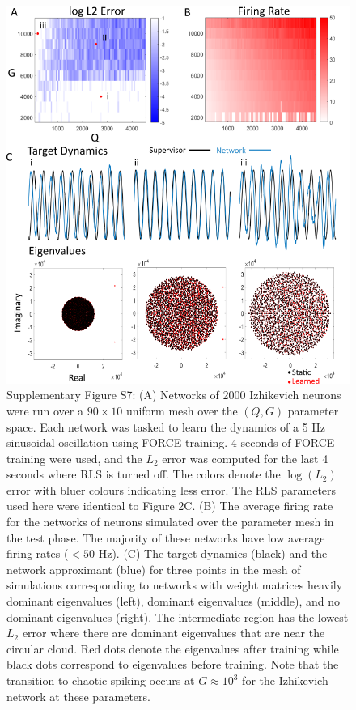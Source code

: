 \documentclass[11pt]{article} %
\begin{document}
\begin{figure}[htp!]
\centering
\includegraphics[scale=0.91]{FFIGS3}
\caption*{Supplementary Figure S7:  (A) Networks of 2000 Izhikevich neurons were run over a $90\times 10$ uniform mesh over the $(Q,G)$ parameter space.  Each network was tasked to learn the dynamics of a 5 Hz sinusoidal oscillation using FORCE training.  4 seconds of FORCE training were used, and the $L_2$ error was computed for the last 4 seconds where RLS is turned off.  The colors denote the $\log(L_2)$ error with bluer colours indicating less error.  The RLS parameters used here were identical to Figure 2C.  (B) The average firing rate for the networks of neurons simulated over the parameter mesh in the test phase.  The majority of these networks have low average firing rates ($<50$ Hz).  (C)  The target dynamics (black) and the network approximant (blue) for three points in the mesh of simulations corresponding to networks with weight matrices heavily dominant eigenvalues (left), dominant eigenvalues (middle), and no dominant eigenvalues (right).  The intermediate region has the lowest $L_2$ error where there are dominant eigenvalues that are near the circular cloud.  Red dots denote the eigenvalues after training while black dots correspond to eigenvalues before training.  Note that the transition to chaotic spiking occurs at $G\approx 10^3$ for the Izhikevich network at these parameters.}
\end{figure}
\end{document}
